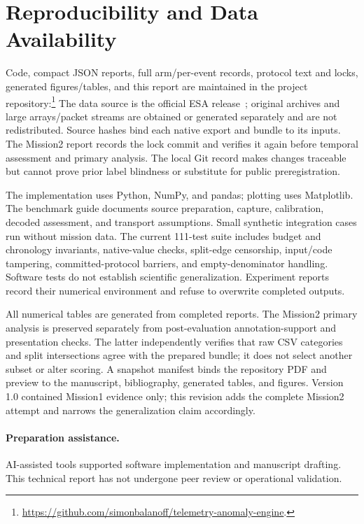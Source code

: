 \section*{Reproducibility and Data Availability}
Code, compact JSON reports, full arm/per-event records, protocol text and locks,
generated figures/tables, and this report are maintained in the project
repository:\footnote{\url{https://github.com/simonbalanoff/telemetry-anomaly-engine}.}
The data source is the official ESA release~\citep{esa2025dataset}; original archives
and large arrays/packet streams are obtained or generated separately and are not
redistributed. Source hashes bind each native export and bundle to its inputs.
The Mission2 report records the lock commit and verifies it again before temporal
assessment and primary analysis. The local Git record makes changes traceable but
cannot prove prior label blindness or substitute for public preregistration.

The implementation uses Python, NumPy, and pandas; plotting uses Matplotlib. The
benchmark guide documents source preparation, capture, calibration, decoded
assessment, and transport assumptions. Small synthetic integration cases run
without mission data. The current 111-test suite includes budget and chronology
invariants, native-value checks, split-edge censorship, input/code tampering,
committed-protocol barriers, and empty-denominator handling. Software tests do
not establish scientific generalization. Experiment reports record their numerical
environment and refuse to overwrite completed outputs.

All numerical tables are generated from completed reports. The Mission2 primary
analysis is preserved separately from post-evaluation annotation-support and
presentation checks. The latter independently verifies that raw CSV categories and
split intersections agree with the prepared bundle; it does not select another
subset or alter scoring. A snapshot manifest binds the repository PDF and preview
to the manuscript, bibliography, generated tables, and figures. Version 1.0
contained Mission1 evidence only; this revision adds the complete Mission2 attempt
and narrows the generalization claim accordingly.


\paragraph{Preparation assistance.}
AI-assisted tools supported software implementation and manuscript drafting.
This technical report has not undergone peer review or operational validation.
